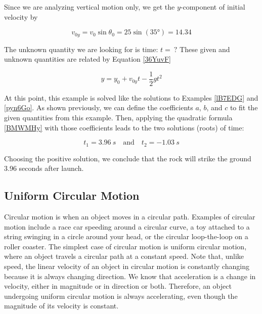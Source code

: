 \documentclass[main.tex]{subfiles}
\begin{document}
\vspace{1em}

Since we are analyzing vertical motion only, we get the $y$-component of initial velocity by

\begin{equation*}
    v_{0y} = v_0 \sin{\theta_0} = 25 \sin{(\ang{35})} = 14.34
\end{equation*}

 The unknown quantity we are looking for is time: $t =\ ?$ These given and unknown quantities are related by Equation \eqref{36YuvF}

\begin{equation*}
    y = y_0 + v_{0y}t - \frac{1}{2} g t^2
\end{equation*}

At this point, this example is solved like the solutions to Examples \ref{lB7EDG} and \ref{pyn6Go}. As shown previously, we can define the coefficients $a$, $b$, and $c$ to fit the given quantities from this example. Then, applying the quadratic formula \eqref{BMWMHy} with those coefficients leads to the two solutions (roots) of time:

\begin{equation*}
    t_1 = \SI{3.96}{s} \quad \text{and} \quad t_2 = \SI{-1.03}{s}
\end{equation*}

Choosing the positive solution, we conclude that the rock will strike the ground 3.96 seconds after launch.


\subsection{Uniform Circular Motion} \label{uPOucv}

Circular motion is when an object moves in a circular path. Examples of circular motion include a race car speeding around a circular curve, a toy attached to a string swinging in a circle around your head, or the circular loop-the-loop on a roller coaster. The simplest case of circular motion is \gls{uniform circular motion}, where an object travels a circular path at a constant speed. Note that, unlike speed, the linear velocity of an object in circular motion is constantly changing because it is always changing direction. We know that acceleration is a change in velocity, either in magnitude or in direction or both. Therefore, an object undergoing uniform circular motion is always accelerating, even though the magnitude of its velocity is constant.
\end{document}
